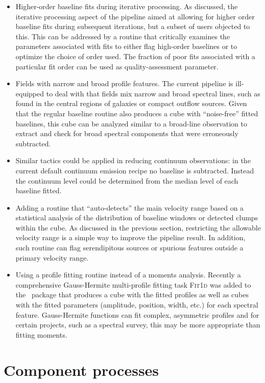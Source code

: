 \documentclass[final,authoryear,5p,times,twocolumn]{elsarticle}
\begin{document}
\begin{itemize}
\item  Higher-order baseline fits during iterative processing. As discussed, the
iterative processing aspect of the pipeline aimed at allowing for higher order
baseline fits during subsequent iterations, but a subset of users objected
to this. This can be addressed by a routine that critically examines the
parameters associated with fits to either flag high-order baselines
or to optimize the choice of order used. The fraction of poor fits associated
with a particular fit order can be used as quality-assessment parameter.
\item Fields with narrow and broad profile features.  The current pipeline
is ill-equipped to deal with that fields mix narrow and broad spectral
lines, such as found in the central regions of galaxies or compact
outflow sources. Given that the regular baseline routine also produces a
cube with ``noise-free'' fitted baselines, this cube can be analyzed similar to a
broad-line observation to extract and check for broad
spectral components that were erroneously subtracted.
\item Similar tactics could be applied in reducing continuum observations:
in the current default continuum emission recipe no baseline is subtracted. Instead the continuum
level could be determined from the median level of each baseline fitted.
\item Adding a routine that ``auto-detects'' the main velocity range based
on a statistical analysis of the distribution of baseline windows or detected clumps
within the cube. As discussed in the previous section, restricting the allowable
velocity range is a simple way to improve the pipeline result. In addition,
such routine can flag serendipitous sources or spurious features outside
a primary velocity range.
\item Using a profile fitting routine instead of a moments analysis. Recently a
comprehensive Gauss-Hermite multi-profile fitting task \textsc{Fit{\footnotesize{1}}d}
was added to the \smurf\ package that produces a cube with the fitted profiles as well
as cubes with the fitted parameters (amplitude, position, width, etc.) for
each spectral feature. Gauss-Hermite functions can fit complex, asymmetric
profiles and for certain projects, such as a spectral survey, this may be more
appropriate than fitting moments.
\end{itemize}

\section{Component processes}
\end{document}
